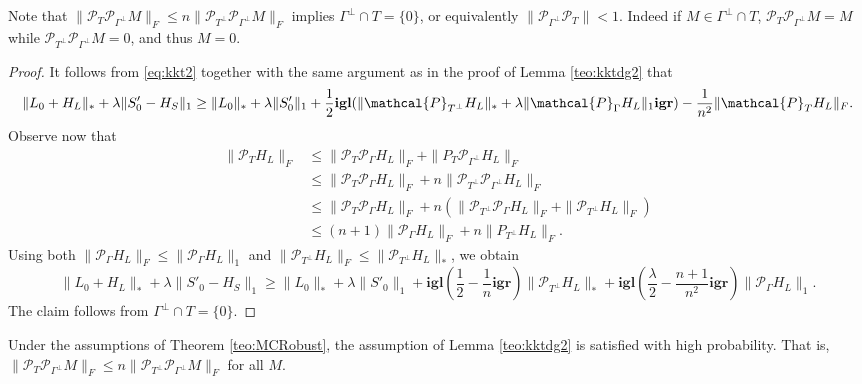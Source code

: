 Note that $\|\mathcal{P}_T \mathcal{P}_{\Gamma^\perp} M\|_F \le n \|\mathcal{P}_{T^\perp} \mathcal{P}_{\Gamma^\perp} M\|_F$ implies
$\Gamma^\perp \cap T = \{0\}$, or equivalently $\|\mathcal{P}_{\Gamma^\perp} \mathcal{P}_T\| < 1$. Indeed if $M \in \Gamma^\perp \cap T$, $\mathcal{P}_T \mathcal{P}_{\Gamma^\perp} M = M$ while
$\mathcal{P}_{T^\perp} \mathcal{P}_{\Gamma^\perp} M = 0$, and thus  $M = 0$.

\begin{proof}
  It follows from \eqref{eq:kkt2} together with the same argument as in the proof of Lemma \ref{teo:kktdg2} that
\[
\|L_0 + H_L\|_* + \lambda \|S'_0 - H_S\|_1 \ge \|L_0\|_* +
\lambda \|S'_0\|_1 + \frac12 \mathbf{igl}(\|\mathcal{P}_{T^\perp} H_L\|_* + \lambda
\|\mathcal{P}_\Gamma H_L\|_1\mathbf{igr}) - {1 \over n^2} \|\mathcal{P}_T H_L\|_F.
\]
Observe now that 
\begin{align*}
  \|\mathcal{P}_T H_L\|_F & \le \|\mathcal{P}_T \mathcal{P}_\Gamma H_L\|_F  + \|P_T\mathcal{P}_{\Gamma^\perp} H_L\|_F  \\
                          & \le \|\mathcal{P}_T \mathcal{P}_\Gamma H_L\|_F  + n\|\mathcal{P}_{T^\perp} \mathcal{P}_{\Gamma^\perp}  H_L\|_F\\
                          & \le \|\mathcal{P}_T \mathcal{P}_\Gamma H_L\|_F  + n(\|\mathcal{P}_{T^\perp} \mathcal{P}_\Gamma H_L\|_F+\|\mathcal{P}_{T^\perp} H_L\|_F)\\
 & \le (n+1) \|\mathcal{P}_\Gamma H_L\|_F  + n \|P_{T^{\perp}} H_L\|_F. 
\end{align*}
Using both $\|\mathcal{P}_\Gamma H_L\|_F \le \|\mathcal{P}_\Gamma H_L\|_1$ and $\|\mathcal{P}_{T^\perp} H_L\|_F \le
\|\mathcal{P}_{T^\perp} H_L\|_*$, we obtain 
\[
\|L_0 + H_L\|_* + \lambda \|S'_0 - H_S\|_1 \ge \|L_0\|_* +
\lambda \|S'_0\|_1 + \mathbf{igl}(\frac12 -\frac{1}{n}\mathbf{igr})
\|\mathcal{P}_{T^\perp} H_L\|_* + \mathbf{igl}(\frac{\lambda}{2} -\frac{n+1}{n^2}\mathbf{igr}) \|\mathcal{P}_\Gamma
H_L\|_1.
\]
The claim follows from $\Gamma^\perp \cap T = \{0\}$.
\end{proof}

\begin{lemma}
\label{teo:xiao}
Under the assumptions of Theorem \ref{teo:MCRobust}, the assumption of Lemma \ref{teo:kktdg2} is satisfied with high probability. That is, $\|\mathcal{P}_T \mathcal{P}_{\Gamma^\perp} M\|_F \leq n\|\mathcal{P}_{T^\perp} \mathcal{P}_{\Gamma^\perp} M\|_F$ for all $M$.
\end{lemma}

